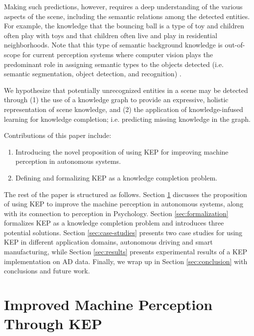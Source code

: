 \documentclass[conference]{IEEEtran}
\begin{document}
Making such predictions, however, requires a deep understanding of the various aspects of the scene, including the semantic relations among the detected entities. For example, the knowledge that the bouncing ball is a type of toy and children often play with toys and that children often live and play in residential neighborhoods. Note that this type of semantic background knowledge is out-of-scope for current perception systems where computer vision plays the predominant role in assigning semantic types to the objects detected (i.e. semantic segmentation, object detection, and recognition) \cite{grigorescu2020survey}. \\

\begin{tcolorbox}[title=Hypothesis]
We hypothesize that potentially unrecognized entities in a scene may be detected through (1) the use of a knowledge graph to provide an expressive, holistic representation of scene knowledge, and (2) the application of knowledge-infused learning for knowledge completion; i.e. predicting missing knowledge in the graph.
\end{tcolorbox}

Contributions of this paper include: 
\begin{enumerate}
    \item Introducing the novel proposition of using KEP for improving machine perception in autonomous systems.
    \item Defining and formalizing KEP as a knowledge completion problem.
\end{enumerate}


The rest of the paper is structured as follows. Section \ref{sec:perception} discusses the proposition of using KEP to improve the machine perception in autonomous systems, along with its connection to perception in Psychology. Section \ref{sec:formalization} formalizes KEP as a knowledge completion problem and introduces three potential solutions. Section \ref{sec:case-studies} presents two case studies for using KEP in different application domains, autonomous driving and smart manufacturing, while Section \ref{sec:results} presents experimental results of a KEP implementation on AD data. Finally, we wrap up in Section \ref{sec:conclusion} with conclusions and future work.

\section{Improved Machine Perception Through KEP} 
\label{sec:perception}
\end{document}
